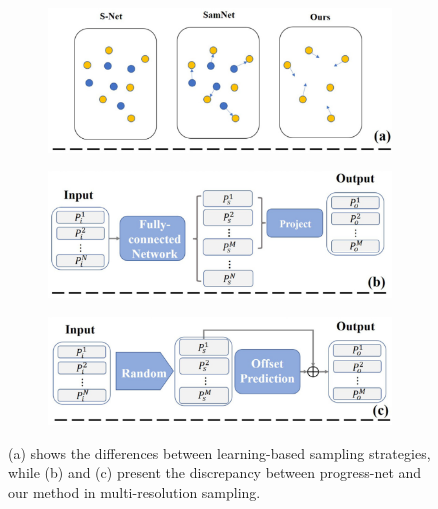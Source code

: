 \documentclass[a4paper,10pt]{article}
\begin{document}
\begin{multicols}{2}
\begin{figure}[H]
    \begin{subfigure}[b]{0.5\textwidth}
        \includegraphics[width=\textwidth]{images/subfig-1.png}
        \label{fig:sub1}
    \end{subfigure}
    \begin{subfigure}[b]{0.5\textwidth}
        \includegraphics[width=\textwidth]{images/subfig-2.png}
        \label{fig:sub2}
    \end{subfigure}
    \begin{subfigure}[b]{0.5\textwidth}
        \includegraphics[width=\textwidth]{images/subfig-3.png}
        \label{fig:sub3}
    \end{subfigure}
    \captionsetup{justification=justified, labelsep=period}
    \caption{(a) shows the differences between learning-based sampling strategies, while (b) and (c) present the discrepancy between progress-net and our method in multi-resolution sampling.}
    \label{fig:fig1}
\end{figure}



\end{multicols}
\end{document}
